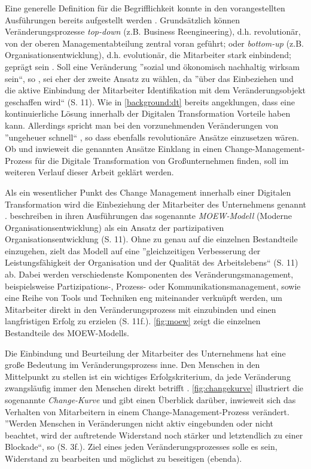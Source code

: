 Eine generelle Definition für die Begrifflichkeit konnte in den vorangestellten Ausführungen bereits aufgestellt werden \cite{kaune_change_2016}. Grundsätzlich können Veränderungsprozesse \textit{top-down} (z.B. Business Reengineering), d.h. revolutionär, von der oberen Managementabteilung zentral voran geführt; oder \textit{bottom-up} (z.B. Organisationsentwicklung), d.h. evolutionär, die Mitarbeiter stark einbindend; geprägt sein \cite[S. 10]{kaune_change_2016}. Soll eine Veränderung ''sozial und ökonomisch nachhaltig wirksam sein``, so , sei eher der zweite Ansatz zu wählen, da ''über
das Einbeziehen und die aktive Einbindung der Mitarbeiter Identifikation mit dem Veränderungsobjekt geschaffen wird`` (S. 11). Wie in \ref{background:dt} bereits angeklungen, dass eine kontinuierliche Lösung innerhalb der Digitalen Transformation Vorteile haben kann. Allerdings spricht man bei den vorzunehmenden Veränderungen von ''ungeheuer schnell``  \cite[S. 10]{oswald_digitale_2018} , so dass ebenfalls revolutionäre Ansätze einzusetzen wären. Ob und inwieweit die genannten Ansätze Einklang in einen Change-Management-Prozess für die Digitale Transformation von Großunternehmen finden, soll im weiteren Verlauf dieser Arbeit geklärt werden.

Als ein wesentlicher Punkt des Change Management innerhalb einer Digitalen Transformation wird die Einbeziehung der Mitarbeiter des Unternehmens genannt \cite[S. 179f.]{hess_digitale_2019}.  beschreiben in ihren Ausführungen das sogenannte \textit{MOEW-Modell} (Moderne Organisationsentwicklung) als ein Ansatz der partizipativen Organisationsentwicklung (S. 11). Ohne zu genau auf die einzelnen Bestandteile einzugehen, zielt das Modell auf eine ''gleichzeitigen Verbesserung der Leistungsfähigkeit der Organisation und der Qualität des Arbeitslebens`` (S. 11) ab. Dabei werden verschiedenste Komponenten des Veränderungsmanagement, beispielsweise Partizipations-, Prozess- oder Kommunikationsmanagement, sowie eine Reihe von Tools und Techniken eng miteinander verknüpft werden, um Mitarbeiter direkt in den Veränderungsprozess mit einzubinden und einen langfristigen Erfolg zu erzielen (S. 11f.). \ref{fig:moew} zeigt die einzelnen Bestandteile des MOEW-Modells.

Die Einbindung und Beurteilung der Mitarbeiter des Unternehmens hat eine große Bedeutung im Veränderungsprozess inne. Den Menschen in den Mittelpunkt zu stellen ist ein wichtiges Erfolgskriterium, da jede Veränderung zwangsläufig immer den Menschen direkt betrifft \cite[S. 3]{bertagnolli_change_2018}. \ref{fig:changekurve} illustriert die sogenannte \textit{Change-Kurve} und gibt einen Überblick darüber, inwieweit sich das Verhalten von Mitarbeitern in einem Change-Management-Prozess verändert. ''Werden Menschen in Veränderungen nicht aktiv eingebunden oder nicht beachtet, wird der auftretende Widerstand noch stärker und letztendlich zu einer Blockade``, so  (S. 3f.). Ziel eines jeden Veränderungsprozesses solle es sein, Widerstand zu bearbeiten und möglichst zu beseitigen (ebenda). 

